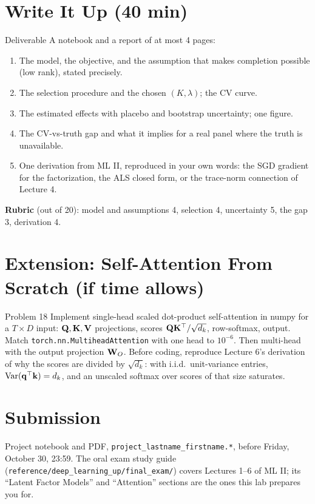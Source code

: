 \documentclass[11pt]{article}
\begin{document}
\section{Write It Up (40 min)}
\begin{task}{Deliverable}
A notebook and a report of at most 4 pages:
\begin{enumerate}[nosep]
  \item The model, the objective, and the assumption that makes completion possible (low rank), stated precisely.
  \item The selection procedure and the chosen $(K,\lambda)$; the CV curve.
  \item The estimated effects with placebo and bootstrap uncertainty; one figure.
  \item The CV-vs-truth gap and what it implies for a real panel where the truth is unavailable.
  \item One derivation from ML II, reproduced in your own words: the SGD gradient for the factorization, the
        ALS closed form, or the trace-norm connection of Lecture 4.
\end{enumerate}
\end{task}
\textbf{Rubric} (out of 20): model and assumptions 4, selection 4, uncertainty 5, the gap 3, derivation 4.

\section{Extension: Self-Attention From Scratch (if time allows)}
\begin{task}{Problem 18}
Implement single-head scaled dot-product self-attention in numpy for a $T\times D$ input: $\mathbf{Q},\mathbf{K},\mathbf{V}$
projections, scores $\mathbf{Q}\mathbf{K}^{\top}/\sqrt{d_k}$, row-softmax, output. Match \texttt{torch.nn.MultiheadAttention}
with one head to $10^{-6}$. Then multi-head with the output projection $\mathbf{W}_O$. Before coding, reproduce
Lecture 6's derivation of why the scores are divided by $\sqrt{d_k}$: with i.i.d.\ unit-variance entries,
$\operatorname{Var}(\mathbf{q}^{\top}\mathbf{k})=d_k$, and an unscaled softmax over scores of that size saturates.
\end{task}

\section*{Submission}
Project notebook and PDF, \texttt{project\_lastname\_firstname.*}, before Friday, October 30, 23:59.
The oral exam study guide (\texttt{reference/deep\_learning\_up/final\_exam/}) covers Lectures 1--6 of ML II;
its ``Latent Factor Models'' and ``Attention'' sections are the ones this lab prepares you for.
\end{document}
